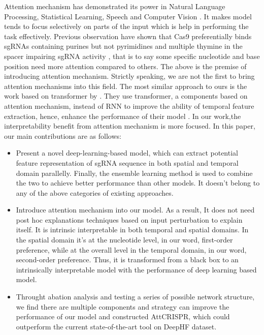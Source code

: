 \documentclass{bioinfo}
\begin{document}
Attention mechanism has demonstrated its power in Natural Language Processing, Statistical Learning, Speech and Computer Vision \citep{chaudhari2019an}. 
 It makes model tends to focus selectively on parts of the input which is help in performing the task effectively. 
 Previous observation have shown that Cas9 preferentially binds sgRNAs containing purines but not pyrimidines \citep{wang2014genetic} and multiple thymine in the spacer impairing sgRNA activity \citep{wu2014genome-wide}, 
 that is to say some specific nucleotide and base position need more attention compared to others. 
 The above is the premise of introducing attention mechanism. Strictly speaking, we are not the first to bring attention mechanisms into this field. 
 The most similar approach to ours is the work based on transformer by \citeauthor{Liu2019}. 
 They use transformer, a components based on attention mechanism, instead of RNN to improve the ability of temporal feature extraction, 
 hence, enhance the performance of their model \citep{Liu2019,vaswani2017attention}. 
 In our work,the interpretability benefit from attention mechanism is more focused.
 In this paper, our main contributions are as follows:\vspace*{1pt}
\begin{itemize}
    \item Present a novel deep-learning-based model, which can extract potential feature representation of sgRNA sequence in both spatial and temporal domain parallelly. 
    Finally, the ensemble learning method is used to combine the two to achieve better performance than other models.
    It doesn't belong to any of the above categories of existing approaches.
    \item Introduce attention mechanism into our model. 
    As a result, It does not need post hoc explanations techniques based on input perturbation to explain itself. 
    It is intrinsic interpretable in both temporal and spatial domains.
    In the spatial domain it's at the nucleotide level, in our word, first-order preference, 
    while at the overall level in the temporal domain, in our word, second-order preference. 
    Thus, it is transformed from a black box to an intrinsically interpretable model with the performance of deep learning based model. 
    \item Throught abation analysis and testing a series of possible network structure, 
    we find there are multiple components and strategy can improve the performance of our model and constructed AttCRISPR, 
    which could outperform the current state-of-the-art tool on DeepHF dataset.\vspace*{1pt}
\end{itemize}
\end{document}
